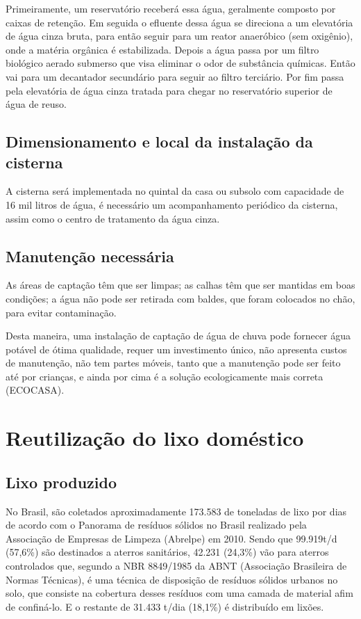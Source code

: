 	Primeiramente, um reservatório receberá essa água, geralmente composto por caixas de retenção. Em seguida o efluente dessa água se direciona a um elevatória de água cinza bruta, para então seguir para um reator anaeróbico (sem oxigênio), onde a matéria orgânica é estabilizada. Depois a água passa por um filtro biológico aerado submerso que visa eliminar o odor de substância químicas. Então vai para um decantador secundário para seguir ao filtro terciário. Por fim passa pela elevatória de água cinza tratada para chegar no reservatório superior de água de reuso.

\subsection{Dimensionamento e local da instalação da cisterna}

A cisterna será implementada no quintal da casa ou subsolo com capacidade de 16 mil litros de água, é necessário um acompanhamento periódico da cisterna, assim como o centro de tratamento da água cinza.

\subsection{Manutenção necessária}

	As áreas de captação têm que ser limpas; as calhas têm que ser mantidas em boas condições; a água não pode ser retirada com baldes, que foram colocados no chão, para evitar contaminação.

	Desta maneira, uma instalação de captação de água de chuva pode fornecer água potável de ótima qualidade, requer um investimento único, não apresenta custos de manutenção, não tem partes móveis, tanto que a manutenção pode ser feito até por crianças, e ainda por cima é a solução ecologicamente mais correta (ECOCASA).

\section{Reutilização do lixo doméstico}

\subsection{Lixo produzido}

	No Brasil, são coletados aproximadamente 173.583 de toneladas de lixo por dias de acordo com o Panorama de resíduos sólidos no Brasil realizado pela Associação de Empresas de Limpeza (Abrelpe) em 2010. Sendo que 99.919t/d (57,6\%) são destinados a aterros sanitários, 42.231 (24,3\%) vão para aterros controlados que, segundo a NBR 8849/1985 da ABNT (Associação Brasileira de Normas Técnicas), é uma técnica de disposição de resíduos sólidos urbanos no solo, que consiste na cobertura desses resíduos com uma camada de material afim de confiná-lo. E o restante de 31.433 t/dia (18,1\%) é distribuído em lixões. 

